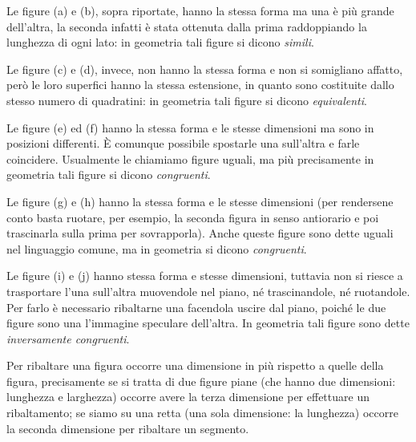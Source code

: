 \begin{figure}[htb]
\centering\qquad\qquad

\end{figure}

Le figure (a) e (b), sopra riportate, hanno la stessa forma ma una è più grande dell'altra, la seconda infatti è stata ottenuta dalla prima raddoppiando la lunghezza di ogni lato: in geometria tali figure si dicono \emph{simili}.

Le figure (c) e (d), invece, non hanno la stessa forma e non si somigliano affatto, però le loro superfici hanno la stessa estensione, in quanto sono costituite dallo stesso numero di quadratini: in geometria tali figure si dicono \emph{equivalenti}.

\begin{figure}[htb]
\centering\qquad\qquad

\end{figure}

Le figure (e) ed (f) hanno la stessa forma e le stesse dimensioni ma sono in posizioni differenti. \`E comunque possibile spostarle una sull'altra e farle coincidere. Usualmente le chiamiamo figure uguali, ma più precisamente in geometria tali figure si dicono \emph{congruenti}.

Le figure (g) e (h) hanno la stessa forma e le stesse dimensioni (per rendersene conto basta ruotare, per esempio, la seconda figura in senso antiorario e poi trascinarla sulla prima per sovrapporla). Anche queste figure sono dette uguali nel linguaggio comune, ma in geometria si dicono \emph{congruenti}.

Le figure (i) e (j) hanno stessa forma e stesse dimensioni, tuttavia non si riesce a trasportare l'una sull'altra muovendole nel piano, né trascinandole, né ruotandole. Per farlo è necessario ribaltarne una facendola uscire dal piano, poiché le due figure sono una l'immagine speculare dell'altra. In geometria tali figure sono dette \emph{inversamente congruenti}.

\begin{figure}[htb]
\centering\label{fig:figure_i_j}
\end{figure}

\osservazione Per ribaltare una figura occorre una dimensione in più rispetto a quelle della figura, precisamente se si tratta di due figure piane (che hanno due dimensioni: lunghezza e larghezza)  occorre avere la terza dimensione per effettuare un ribaltamento; se siamo su una retta (una sola dimensione: la lunghezza) occorre la seconda dimensione per ribaltare un segmento.

